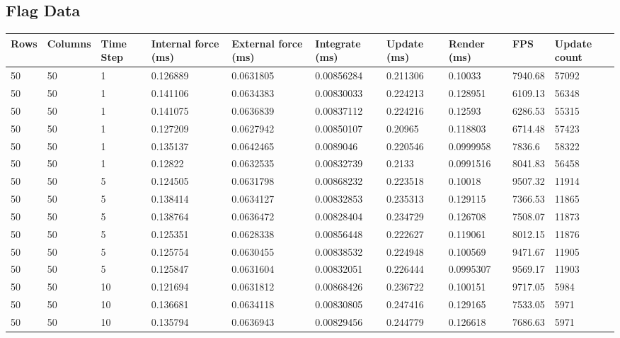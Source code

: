 \begin{landscape}
\subsection{Flag Data}

\begin{longtable}{ | l | l | l | l | l | l | l | l | l | l | }
\hline
 Rows &  Columns &  Time Step &  Internal force (ms) &  External force (ms) &  Integrate (ms) &  Update (ms) &  Render (ms) &  FPS &  Update count \\ \hline
50 & 50 & 1 & 0.126889 & 0.0631805 & 0.00856284 & 0.211306 & 0.10033 & 7940.68 & 57092\\ \hline
50 & 50 & 1 & 0.141106 & 0.0634383 & 0.00830033 & 0.224213 & 0.128951 & 6109.13 & 56348\\ \hline
50 & 50 & 1 & 0.141075 & 0.0636839 & 0.00837112 & 0.224216 & 0.12593 & 6286.53 & 55315\\ \hline
50 & 50 & 1 & 0.127209 & 0.0627942 & 0.00850107 & 0.20965 & 0.118803 & 6714.48 & 57423\\ \hline
50 & 50 & 1 & 0.135137 & 0.0642465 & 0.0089046 & 0.220546 & 0.0999958 & 7836.6 & 58322\\ \hline
50 & 50 & 1 & 0.12822 & 0.0632535 & 0.00832739 & 0.2133 & 0.0991516 & 8041.83 & 56458\\ \hline
50 & 50 & 5 & 0.124505 & 0.0631798 & 0.00868232 & 0.223518 & 0.10018 & 9507.32 & 11914\\ \hline
50 & 50 & 5 & 0.138414 & 0.0634127 & 0.00832853 & 0.235313 & 0.129115 & 7366.53 & 11865\\ \hline
50 & 50 & 5 & 0.138764 & 0.0636472 & 0.00828404 & 0.234729 & 0.126708 & 7508.07 & 11873\\ \hline
50 & 50 & 5 & 0.125351 & 0.0628338 & 0.00856448 & 0.222627 & 0.119061 & 8012.15 & 11876\\ \hline
50 & 50 & 5 & 0.125754 & 0.0630455 & 0.00838532 & 0.224948 & 0.100569 & 9471.67 & 11905\\ \hline
50 & 50 & 5 & 0.125847 & 0.0631604 & 0.00832051 & 0.226444 & 0.0995307 & 9569.17 & 11903\\ \hline
50 & 50 & 10 & 0.121694 & 0.0631812 & 0.00868426 & 0.236722 & 0.100151 & 9717.05 & 5984\\ \hline
50 & 50 & 10 & 0.136681 & 0.0634118 & 0.00830805 & 0.247416 & 0.129165 & 7533.05 & 5971\\ \hline
50 & 50 & 10 & 0.135794 & 0.0636943 & 0.00829456 & 0.244779 & 0.126618 & 7686.63 & 5971\\ \hline

\end{longtable}
\end{landscape}
